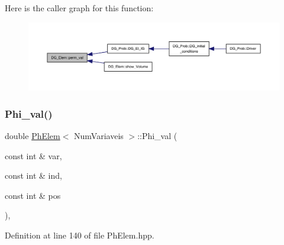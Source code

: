 Here is the caller graph for this function\+:
\nopagebreak
\begin{figure}[H]
\begin{center}
\leavevmode
\includegraphics[width=350pt]{classDG__Elem_a699a198b44d02b1394229e623cd6632d_icgraph}
\end{center}
\end{figure}
\mbox{\label{classPhElem_aa67e9fd1399ee905803999ef50581677}} 
\subsubsection{\texorpdfstring{Phi\+\_\+val()}{Phi\_val()}}
{\footnotesize\ttfamily double \hyperlink{classPhElem}{Ph\+Elem}$<$ Num\+Variaveis $>$\+::Phi\+\_\+val (\begin{DoxyParamCaption}\item[{const int \&}]{var,  }\item[{const int \&}]{ind,  }\item[{const int \&}]{pos }\end{DoxyParamCaption})\hspace{0.3cm}{\ttfamily [inline]}, {\ttfamily [inherited]}}



Definition at line 140 of file Ph\+Elem.\+hpp.



